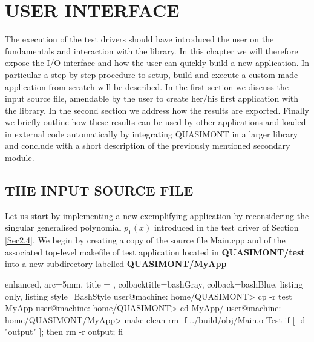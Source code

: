 \documentclass[a4paper, twosided]{book}
\begin{document}
\chapter[User interface]{\Huge \ttfamily USER INTERFACE}

The execution of the test drivers should have introduced the user on the fundamentals and interaction with the library. In this chapter we will therefore expose the I/O interface and how the user can quickly build a new application. In particular a step-by-step procedure to setup, build and execute a custom-made application from scratch will be described. In the first section we discuss the input source file, amendable by the user to create her/his first application with the library. In the second section we address how the results are exported. Finally we briefly outline how these results can be used by other applications and loaded in external code automatically by integrating QUASIMONT in a larger library and conclude with a short description of the previously mentioned secondary module.

\section[The input source file]{\changefont THE INPUT SOURCE FILE}\label{Sec3.1}

\noindent
Let us start by implementing a new exemplifying application by reconsidering the singular generalised polynomial $p_1(x)$ introduced in the test driver of Section \ref{Sec2.4}. We begin by creating a copy of the source file \colorbox{poliGrayBlue}{Main.cpp} and of the associated top-level makefile of test application located in  \colorbox{poliGrayBlue}{\textbf{QUASIMONT/test}} into a new subdirectory labelled \colorbox{poliGrayBlue}{\textbf{QUASIMONT/MyApp}}

\vspace{0.5cm}
\begin{tcblisting}{enhanced,
                   arc=5mm,
                   title = \color{black}{\large \ttfamily Creation of application's directory},
                   colbacktitle=bashGray,
                   colback=bashBlue,
                   listing only,
                   listing style=BashStyle}
user@machine: home/QUASIMONT> cp -r test MyApp
user@machine: home/QUASIMONT> cd MyApp/
user@machine: home/QUASIMONT/MyApp> make clean
rm -f ../build/obj/Main.o Test
if [ -d "output" ]; then rm -r output; fi 
\end{tcblisting}
\vspace{0.5cm}
\end{document}
